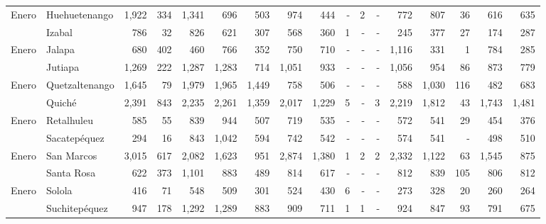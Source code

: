 \begin{landscape}
\begin{center}
\begin{longtable}{llrrrrrrrrrrrrrrr}
\multicolumn{1}{l}{	\footnotesize	 Enero 	}&	 Huehuetenango 	&	 1,922 	&	 334 	&	 1,341 	&	 696 	&	 503 	&	 974 	&	 444 	&	 -   	&	 2 	&	 -   	&	 772 	&	 807 	&	 36 	&	 616 	&	 635 	\\
\rowcolor{color1!5!white}\multicolumn{1}{l}{	\footnotesize	 Enero 	}&	 Izabal 	&	 786 	&	 32 	&	 826 	&	 621 	&	 307 	&	 568 	&	 360 	&	 1 	&	 -   	&	 -   	&	 245 	&	 377 	&	 27 	&	 174 	&	 287 	\\
\multicolumn{1}{l}{	\footnotesize	 Enero 	}&	 Jalapa 	&	 680 	&	 402 	&	 460 	&	 766 	&	 352 	&	 750 	&	 710 	&	 -   	&	 -   	&	 -   	&	 1,116 	&	 331 	&	 1 	&	 784 	&	 285 	\\
\rowcolor{color1!5!white}\multicolumn{1}{l}{	\footnotesize	 Enero 	}&	 Jutiapa 	&	 1,269 	&	 222 	&	 1,287 	&	 1,283 	&	 714 	&	 1,051 	&	 933 	&	 -   	&	 -   	&	 -   	&	 1,056 	&	 954 	&	 86 	&	 873 	&	 779 	\\
\multicolumn{1}{l}{	\footnotesize	 Enero 	}&	 Quetzaltenango 	&	 1,645 	&	 79 	&	 1,979 	&	 1,965 	&	 1,449 	&	 758 	&	 506 	&	 -   	&	 -   	&	 -   	&	 588 	&	 1,030 	&	 116 	&	 482 	&	 683 	\\
\rowcolor{color1!5!white}\multicolumn{1}{l}{	\footnotesize	 Enero 	}&	 Quiché 	&	 2,391 	&	 843 	&	 2,235 	&	 2,261 	&	 1,359 	&	 2,017 	&	 1,229 	&	 5 	&	 -   	&	 3 	&	 2,219 	&	 1,812 	&	 43 	&	 1,743 	&	 1,481 	\\
\multicolumn{1}{l}{	\footnotesize	 Enero 	}&	 Retalhuleu 	&	 585 	&	 55 	&	 839 	&	 944 	&	 507 	&	 719 	&	 535 	&	 -   	&	 -   	&	 -   	&	 572 	&	 541 	&	 29 	&	 454 	&	 376 	\\
\rowcolor{color1!5!white}\multicolumn{1}{l}{	\footnotesize	 Enero 	}&	 Sacatepéquez 	&	 294 	&	 16 	&	 843 	&	 1,042 	&	 594 	&	 742 	&	 542 	&	 -   	&	 -   	&	 -   	&	 574 	&	 541 	&	 -   	&	 498 	&	 510 	\\
\multicolumn{1}{l}{	\footnotesize	 Enero 	}&	 San Marcos 	&	 3,015 	&	 617 	&	 2,082 	&	 1,623 	&	 951 	&	 2,874 	&	 1,380 	&	 1 	&	 2 	&	 2 	&	 2,332 	&	 1,122 	&	 63 	&	 1,545 	&	 875 	\\
\rowcolor{color1!5!white}\multicolumn{1}{l}{	\footnotesize	 Enero 	}&	 Santa Rosa 	&	 622 	&	 373 	&	 1,101 	&	 883 	&	 489 	&	 814 	&	 617 	&	 -   	&	 -   	&	 -   	&	 812 	&	 839 	&	 105 	&	 806 	&	 812 	\\
\multicolumn{1}{l}{	\footnotesize	 Enero 	}&	 Solola 	&	 416 	&	 71 	&	 548 	&	 509 	&	 301 	&	 524 	&	 430 	&	 6 	&	 -   	&	 -   	&	 273 	&	 328 	&	 20 	&	 260 	&	 264 	\\
\rowcolor{color1!5!white}\multicolumn{1}{l}{	\footnotesize	 Enero 	}&	 Suchitepéquez 	&	 947 	&	 178 	&	 1,292 	&	 1,289 	&	 883 	&	 909 	&	 711 	&	 1 	&	 1 	&	 -   	&	 924 	&	 847 	&	 93 	&	 791 	&	 675 	\\

\end{longtable}
\end{center}
\end{landscape}

